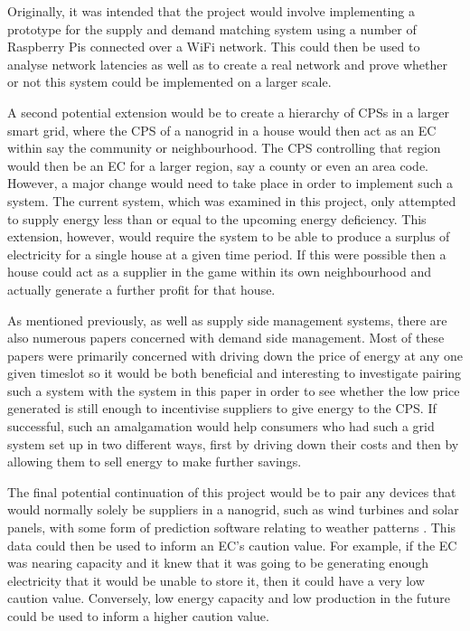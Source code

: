 \documentclass[a4paper, notitlepage]{report}
\begin{document}
Originally, it was intended that the project would involve implementing a
prototype for the supply and demand matching system using a number of Raspberry
Pis connected over a WiFi network. This could then be used to analyse network
latencies as well as to create a real network and prove whether or not this
system could be implemented on a larger scale.

A second potential extension would be to create a hierarchy of CPSs in a larger
smart grid, where the CPS of a nanogrid in a house would then act as an EC
within say the community or neighbourhood. The CPS controlling that region would
then be an EC for a larger region, say a county or even an area code. However, a
major change would need to take place in order to implement such a system. The
current system, which was examined in this project, only attempted to supply
energy less than or equal to the upcoming energy deficiency. This extension,
however, would require the system to be able to produce a surplus of electricity
for a single house at a given time period. If this were possible then a house
could act as a supplier in the game within its own neighbourhood and actually
generate a further profit for that house.

As mentioned previously, as well as supply side management systems, there are
also numerous papers concerned with demand side management. Most of these papers
were primarily concerned with driving down the price of energy at any one given
timeslot so it would be both beneficial and interesting to investigate pairing
such a system with the system in this paper in order to see whether the low
price generated is still enough to incentivise suppliers to give energy to the
CPS. If successful, such an amalgamation would help consumers who had such a
grid system set up in two different ways, first by driving down their costs and
then by allowing them to sell energy to make further savings.

The final potential continuation of this project would be to pair any devices
that would normally solely be suppliers in a nanogrid, such as wind turbines and
solar panels, with some form of prediction software relating to weather patterns
\cite{foley2012current}. This data could then be used to inform an EC’s caution
value. For example, if the EC was nearing capacity and it knew that it was going
to be generating enough electricity that it would be unable to store it, then it
could have a very low caution value. Conversely, low energy capacity and low
production in the future could be used to inform a higher caution value.
\end{document}

